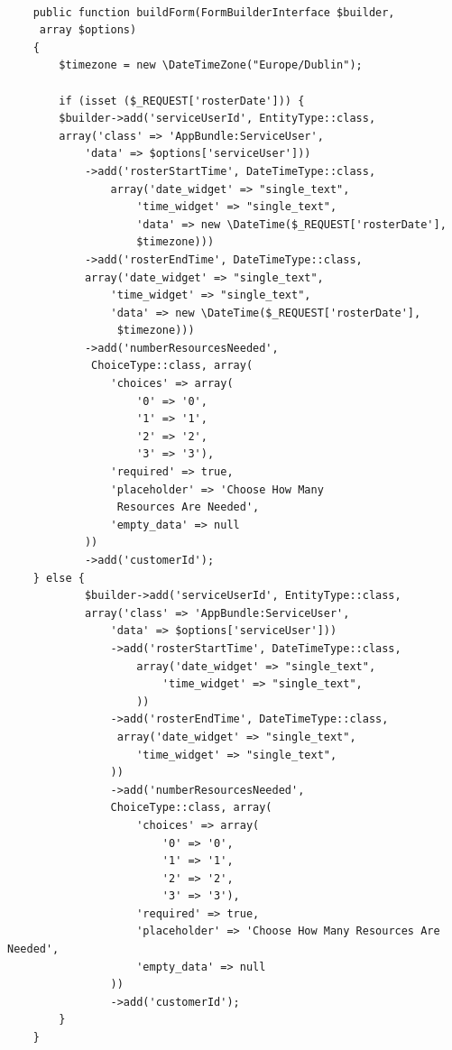 \documentclass[a4paper,12pt]{article}
\begin{document}
\begin{verbatim}

    public function buildForm(FormBuilderInterface $builder,
     array $options)
    {
        $timezone = new \DateTimeZone("Europe/Dublin");

        if (isset ($_REQUEST['rosterDate'])) {
        $builder->add('serviceUserId', EntityType::class, 
        array('class' => 'AppBundle:ServiceUser',
            'data' => $options['serviceUser']))
            ->add('rosterStartTime', DateTimeType::class,
                array('date_widget' => "single_text",
                    'time_widget' => "single_text",
                    'data' => new \DateTime($_REQUEST['rosterDate'], 
                    $timezone)))
            ->add('rosterEndTime', DateTimeType::class, 
            array('date_widget' => "single_text",
                'time_widget' => "single_text",
                'data' => new \DateTime($_REQUEST['rosterDate'],
                 $timezone)))
            ->add('numberResourcesNeeded',
             ChoiceType::class, array(
                'choices' => array(
                    '0' => '0',
                    '1' => '1',
                    '2' => '2',
                    '3' => '3'),
                'required' => true,
                'placeholder' => 'Choose How Many
                 Resources Are Needed',
                'empty_data' => null
            ))
            ->add('customerId');
    } else {
            $builder->add('serviceUserId', EntityType::class, 
            array('class' => 'AppBundle:ServiceUser',
                'data' => $options['serviceUser']))
                ->add('rosterStartTime', DateTimeType::class,
                    array('date_widget' => "single_text",
                        'time_widget' => "single_text",
                    ))
                ->add('rosterEndTime', DateTimeType::class,
                 array('date_widget' => "single_text",
                    'time_widget' => "single_text",
                ))
                ->add('numberResourcesNeeded', 
                ChoiceType::class, array(
                    'choices' => array(
                        '0' => '0',
                        '1' => '1',
                        '2' => '2',
                        '3' => '3'),
                    'required' => true,
                    'placeholder' => 'Choose How Many Resources Are Needed',
                    'empty_data' => null
                ))
                ->add('customerId');
        }
    }
\end{verbatim}
 
\end{document}
